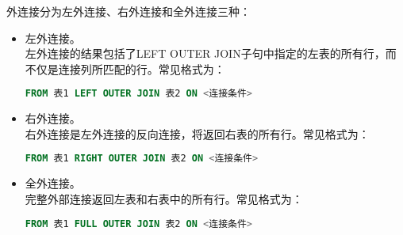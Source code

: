 \documentclass[a4paper]{uestcreport}
\begin{document}
外连接分为左外连接、右外连接和全外连接三种：
\begin{itemize}
    \item 左外连接。\\
          左外连接的结果包括了LEFT OUTER JOIN子句中指定的左表的所有行，而不仅是连接列所匹配的行。常见格式为：
          \begin{lstlisting}[language=SQL]
        FROM 表1 LEFT OUTER JOIN 表2 ON <连接条件>
    \end{lstlisting}
    \item 右外连接。\\
          右外连接是左外连接的反向连接，将返回右表的所有行。常见格式为：
          \begin{lstlisting}[language=SQL]
        FROM 表1 RIGHT OUTER JOIN 表2 ON <连接条件>
    \end{lstlisting}
    \item 全外连接。\\
          完整外部连接返回左表和右表中的所有行。常见格式为：
          \begin{lstlisting}[language=SQL]
        FROM 表1 FULL OUTER JOIN 表2 ON <连接条件>
    \end{lstlisting}
\end{itemize}
\end{document}
